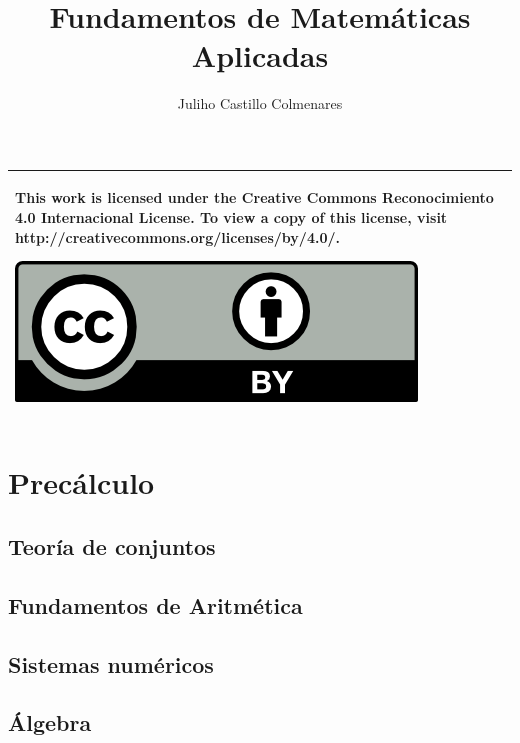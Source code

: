 \documentclass[
]{tufte-book}
\title{Fundamentos de Matemáticas Aplicadas}
\author{Juliho Castillo Colmenares}
\begin{document}
	\maketitle
\begin{tabular}{|p{}|}
	\hline
	This work is licensed under the Creative Commons Reconocimiento 4.0 Internacional License. To view a copy of this license, visit
	http://creativecommons.org/licenses/by/4.0/.
	\begin{center}
		\includegraphics[scale=1]{./licencia/by.png}
	\end{center}\\
	\hline
\end{tabular}
\tableofcontents


\part{Precálculo}

\chapter{Teoría de conjuntos}





\chapter{Fundamentos de Aritmética}






\chapter{Sistemas numéricos}





\chapter{Álgebra}
\end{document}
